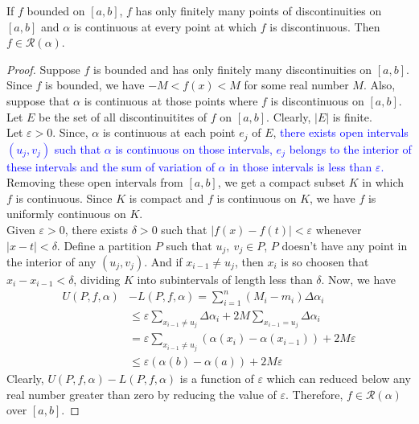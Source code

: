 \begin{theorem}
	If $f$ bounded on $[a,b]$, $f$ has only finitely many points of discontinuities on $[a,b]$ and $\alpha$ is continuous at every point at which $f$ is discontinuous.
	Then $f \in \mathscr{R}(\alpha)$.
\end{theorem}
\begin{proof}
	Suppose $f$ is bounded and has only finitely many discontinuities on $[a,b]$.
	Since $f$ is bounded, we have $-M < f(x) < M$ for some real number $M$.
	Also, suppose that $\alpha$ is continuous at those points where $f$ is discontinuous on $[a,b]$.\\

	Let $E$ be the set of all discontinuitites of $f$ on $[a,b]$.
	Clearly, $|E|$ is finite.\\

	Let $\varepsilon > 0$.
	Since, $\alpha$ is continuous at each point $e_j$ of $E$, \textcolor{blue}{there exists open intervals $(u_j,v_j)$ such that $\alpha$ is continuous on those intervals, $e_j$ belongs to the interior of these intervals and the sum of variation of $\alpha$ in those intervals is less than $\varepsilon$.}\\

	Removing these open intervals from $[a,b]$, we get a compact subset $K$ in which $f$ is continuous.
	Since $K$ is compact and $f$ is continuous on $K$, we have $f$ is uniformly continuous on $K$.\\

	Given $\varepsilon > 0$, there exists $\delta > 0$ such that $|f(x)-f(t)| < \varepsilon$ whenever $|x-t|<\delta$.
	Define a partition $P$ such that $u_j,\ v_j \in P$, $P$ doesn't have any point in the interior of any $(u_j,v_j)$.
	And if $x_{i-1} \ne u_j$, then $x_i$ is so choosen that $x_i-x_{i-1} < \delta$, dividing $K$ into subintervals of length less than $\delta$.
	Now, we have
	\begin{align*}
	U(P,f,\alpha) & - L(P,f,\alpha)
		 = \sum_{i=1}^n (M_i-m_i) \Delta \alpha_i  \\
		& \le \varepsilon \sum_{x_{i-1} \ne u_j} \Delta\alpha_i + 2M\sum_{x_{i-1} = u_j} \Delta\alpha_i \\
		& = \varepsilon \sum_{x_{i-1} \ne u_j} \left(\alpha(x_i)-\alpha(x_{i-1}) \right) + 2M\varepsilon \\
		& \le \varepsilon (\alpha(b)-\alpha(a)) + 2M\varepsilon
	\end{align*}
	Clearly, $U(P,f,\alpha)-L(P,f,\alpha)$ is a function of $\varepsilon$ which can reduced below any real number greater than zero by reducing the value of $\varepsilon$.
	Therefore, $f \in \mathscr{R}(\alpha)$ over $[a,b]$.
\end{proof}


